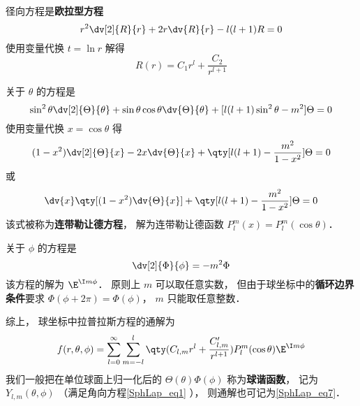 径向方程是\textbf{欧拉型方程}
\begin{equation}
r^2\dv[2]{R}{r} + 2r\dv{R}{r} - l(l+1)R = 0
\end{equation}
使用变量代换 $t = \ln r$ 解得
\begin{equation}
R(r) = C_1 r^l + \frac{C_2}{r^{l+1}}
\end{equation}

关于 $\theta$ 的方程是
\begin{equation}
\sin^2\theta \dv[2]{\Theta}{\theta} + \sin\theta\cos\theta\dv{\Theta}{\theta} + [l(l+1)\sin^2\theta - m^2] \Theta = 0
\end{equation}
使用变量代换 $x = \cos\theta$ 得
\begin{equation}
(1-x^2)\dv[2]{\Theta}{x} - 2x\dv{\Theta}{x} + \qty[l(l+1) - \frac{m^2}{1-x^2}]\Theta = 0
\end{equation}
或
\begin{equation}
\dv{x} \qty[(1-x^2)\dv{\Theta}{x}] + \qty[l(l+1) - \frac{m^2}{1-x^2}]\Theta = 0
\end{equation}
该式被称为\textbf{连带勒让德方程}， 解为连带勒让德函数 $P_l^m(x) = P_l^m(\cos\theta)$．

关于 $\phi$ 的方程是
\begin{equation}
\dv[2]{\Phi}{\phi} = -m^2 \Phi
\end{equation}
该方程的解为 $\E^{\I m\phi}$． 原则上 $m$ 可以取任意实数， 但由于球坐标中的\textbf{循环边界条件}要求 $\Phi(\phi + 2\pi) = \Phi(\phi)$， $m$ 只能取任意整数．

综上， 球坐标中拉普拉斯方程的通解为
\begin{equation}\label{SphLap_eq6}
f(r, \theta, \phi) = \sum_{l = 0}^\infty \sum_{m = -l}^l \qty(C_{l,m} r^l + \frac{C'_{l,m}}{r^{l+1}})P_l^m(\cos\theta)\E^{\I m\phi}
\end{equation}
我们一般把在单位球面上归一化后的 $\Theta(\theta)\Phi(\phi)$ 称为\textbf{球谐函数}， 记为 $Y_{l,m}(\theta,\phi)$ （满足角向方程\autoref{SphLap_eq1} ）， 则通解也可记为\autoref{SphLap_eq7}．

